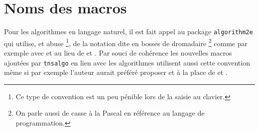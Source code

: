 \documentclass[12pt,a4paper]{article}
\begin{document}
\section{Noms des macros}


Pour les algorithmes en langage naturel, il est fait appel au package \verb#algorithm2e# qui utilise, et abuse
\footnote{
	Ce type de convention est un peu pénible lors de la saisie au clavier.
},
de la notation dite en bosses de dromadaire
\footnote{
	 On parle aussi de casse à la Pascal en référence au langage de programmation.
}
comme par exemple avec  et  au lieu de  et .
Par souci de cohérence les nouvelles macros ajoutées par \verb#tnsalgo# en lien avec les algorithmes utilisent aussi cette convention même si par exemple l'auteur aurait préféré proposer  et  à la place de  et .




\end{document}
